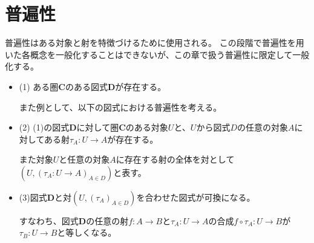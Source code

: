 \documentclass[dvipdfmx]{jsarticle}
\newcommand{\cat}[1]{\boldsymbol{#1}}
\newcommand{\arrow}{\rightarrow}
\newcommand{\mor}[3]{#1:#2\arrow #3}
\begin{document}
	\section{普遍性}
	普遍性はある対象と射を特徴づけるために使用される。
	この段階で普遍性を用いた各概念を一般化することはできないが、この章で扱う普遍性に限定して一般化する。
	\begin{itemize}
		\item (1) ある圏$\cat{C}$のある図式$\cat{D}$が存在する。

		また例として、以下の図式における普遍性を考える。
		\begin{center}
		\end{center}
		\item (2) (1)の図式$\cat{D}$に対して圏$\cat{C}$のある対象$U$と、$U$から図式$D$の任意の対象$A$に対してある射$\mor{\tau_A}{U}{A}$が存在する。

		また対象$U$と任意の対象$A$に存在する射の全体を対として$(U,(\mor{\tau_A}{U}{A})_{A\in D})$と表す。
		\begin{center}
		\end{center}
		\item (3)図式$\cat{D}$と対$(U,(\tau_A)_{A\in D})$を合わせた図式が可換になる。

		すなわち、図式$\cat{D}$の任意の射$\mor{f}{A}{B}$と$\mor{\tau_A}{U}{A}$の合成$\mor{f\circ\tau_A}{U}{B}$が$\mor{\tau_B}{U}{B}$と等しくなる。


\end{itemize}
\end{document}
